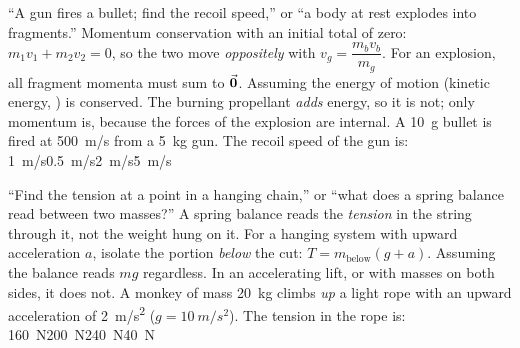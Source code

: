 {``A gun fires a bullet; find the recoil speed,'' or ``a body at rest explodes into fragments.''}
{Momentum conservation with an initial total of zero: $m_1v_1+m_2v_2=0$, so the two move
\emph{oppositely} with $v_g=\dfrac{m_bv_b}{m_g}$. For an explosion, all fragment momenta must sum
to $\vec{\bm{0}}$.}
{Assuming the energy of motion (kinetic energy, ) is conserved. The burning propellant
\emph{adds} energy, so it is not; only momentum is, because the forces of the explosion are internal.}
{A \SI{10}{g} bullet is fired at \SI{500}{m/s} from a \SI{5}{kg} gun. The recoil speed of the gun is:}
{\SI{1}{m/s}}{\SI{0.5}{m/s}}{\SI{2}{m/s}}{\SI{5}{m/s}}

{``Find the tension at a point in a hanging chain,'' or ``what does a spring balance read between two
masses?''}
{A spring balance reads the \emph{tension} in the string through it, not the weight hung on it. For a
hanging system with upward acceleration $a$, isolate the portion \emph{below} the cut:
$T=m_{\text{below}}(g+a)$.}
{Assuming the balance reads $mg$ regardless. In an accelerating lift, or with masses on both sides, it
does not.}
{A monkey of mass \SI{20}{kg} climbs \emph{up} a light rope with an upward acceleration of
\SI{2}{m/s^2} ($g=\SI{10}{m/s^2}$). The tension in the rope is:}
{\SI{160}{N}}{\SI{200}{N}}{\SI{240}{N}}{\SI{40}{N}}

